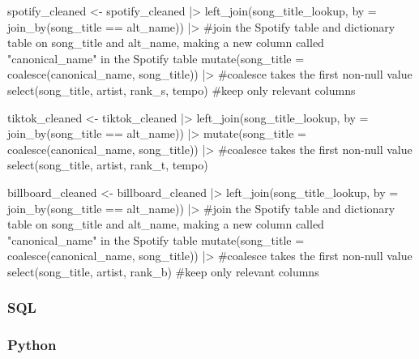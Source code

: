 \documentclass[
  letterpaper,
  DIV=11,
  numbers=noendperiod]{scrreprt}
\newenvironment{Shaded}{\begin{snugshade}}{\end{snugshade}}
\newcommand{\AttributeTok}[1]{\textcolor[rgb]{0.40,0.45,0.13}{#1}}
\newcommand{\CommentTok}[1]{\textcolor[rgb]{0.37,0.37,0.37}{#1}}
\newcommand{\FunctionTok}[1]{\textcolor[rgb]{0.28,0.35,0.67}{#1}}
\newcommand{\NormalTok}[1]{\textcolor[rgb]{0.00,0.23,0.31}{#1}}
\newcommand{\OtherTok}[1]{\textcolor[rgb]{0.00,0.23,0.31}{#1}}
\newcommand{\SpecialCharTok}[1]{\textcolor[rgb]{0.37,0.37,0.37}{#1}}
\begin{document}
\begin{Shaded}
\begin{Highlighting}[]
\NormalTok{spotify\_cleaned }\OtherTok{\textless{}{-}}\NormalTok{ spotify\_cleaned }\SpecialCharTok{|\textgreater{}}
  \FunctionTok{left\_join}\NormalTok{(song\_title\_lookup, }\AttributeTok{by =} \FunctionTok{join\_by}\NormalTok{(song\_title }\SpecialCharTok{==}\NormalTok{ alt\_name)) }\SpecialCharTok{|\textgreater{}} \CommentTok{\#join the Spotify table and dictionary table on song\_title and alt\_name, making a new column called "canonical\_name" in the Spotify table}
  \FunctionTok{mutate}\NormalTok{(}\AttributeTok{song\_title =} \FunctionTok{coalesce}\NormalTok{(canonical\_name, song\_title)) }\SpecialCharTok{|\textgreater{}} \CommentTok{\#coalesce takes the first non{-}null value}
  \FunctionTok{select}\NormalTok{(song\_title, artist, rank\_s, tempo) }\CommentTok{\#keep only relevant columns}
\end{Highlighting}
\end{Shaded}

\begin{Shaded}
\begin{Highlighting}[]
\NormalTok{tiktok\_cleaned }\OtherTok{\textless{}{-}}\NormalTok{ tiktok\_cleaned }\SpecialCharTok{|\textgreater{}}
  \FunctionTok{left\_join}\NormalTok{(song\_title\_lookup, }\AttributeTok{by =} \FunctionTok{join\_by}\NormalTok{(song\_title }\SpecialCharTok{==}\NormalTok{ alt\_name)) }\SpecialCharTok{|\textgreater{}}
  \FunctionTok{mutate}\NormalTok{(}\AttributeTok{song\_title =} \FunctionTok{coalesce}\NormalTok{(canonical\_name, song\_title)) }\SpecialCharTok{|\textgreater{}} \CommentTok{\#coalesce takes the first non{-}null value}
  \FunctionTok{select}\NormalTok{(song\_title, artist, rank\_t, tempo)}
\end{Highlighting}
\end{Shaded}

\begin{Shaded}
\begin{Highlighting}[]
\NormalTok{billboard\_cleaned }\OtherTok{\textless{}{-}}\NormalTok{ billboard\_cleaned }\SpecialCharTok{|\textgreater{}}
  \FunctionTok{left\_join}\NormalTok{(song\_title\_lookup, }\AttributeTok{by =} \FunctionTok{join\_by}\NormalTok{(song\_title }\SpecialCharTok{==}\NormalTok{ alt\_name)) }\SpecialCharTok{|\textgreater{}} \CommentTok{\#join the Spotify table and dictionary table on song\_title and alt\_name, making a new column called "canonical\_name" in the Spotify table}
  \FunctionTok{mutate}\NormalTok{(}\AttributeTok{song\_title =} \FunctionTok{coalesce}\NormalTok{(canonical\_name, song\_title)) }\SpecialCharTok{|\textgreater{}} \CommentTok{\#coalesce takes the first non{-}null value}
  \FunctionTok{select}\NormalTok{(song\_title, artist, rank\_b) }\CommentTok{\#keep only relevant columns}
\end{Highlighting}
\end{Shaded}

\subsubsection{SQL}

\subsubsection{Python}
\end{document}

